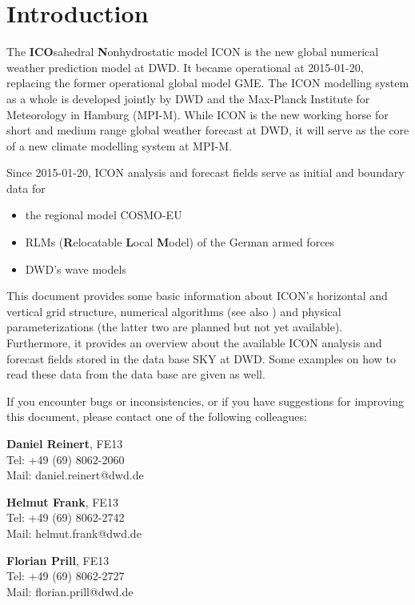 \chapter{Introduction}

The \textbf{ICO}sahedral \textbf{N}onhydrostatic model ICON is the new global numerical 
weather prediction model at DWD. It became operational at 2015-01-20, replacing the former  
operational global model GME. The ICON modelling system as a whole is developed jointly by DWD and the 
Max-Planck Institute for Meteorology in Hamburg (MPI-M). While ICON is the new working horse 
for short and medium range global weather forecast at DWD, it will serve as the core of a new climate 
modelling system at MPI-M.

Since 2015-01-20, ICON analysis and forecast fields serve as initial and boundary data for
\begin{itemize}
 \item the regional model COSMO-EU
 \item RLMs (\textbf{R}elocatable \textbf{L}ocal \textbf{M}odel) of the German armed forces
 \item DWD's wave models
\end{itemize}

This document provides some basic information about ICON's horizontal and vertical grid structure, 
numerical algorithms (see also \cite{Zaengl15}) and physical parameterizations (the latter two are 
planned but not yet available). Furthermore, it provides an overview about the available ICON analysis 
and forecast fields stored in the data base SKY at DWD. Some examples on how to read these data from 
the data base are given as well.

\vfill
If you encounter bugs or inconsistencies, or if you have suggestions for improving this document, 
please contact one of the following colleagues:

\begin{note}
\begin{minipage}{\textwidth}
\centering
\begin{minipage}{0.32\textwidth}
 \textbf{Daniel Reinert}, FE13 \\
 Tel: +49 (69) 8062-2060 \\ 
 Mail: daniel.reinert@dwd.de
\end{minipage}
\begin{minipage}{0.32\textwidth}
 \textbf{Helmut Frank}, FE13\\
 Tel: +49 (69) 8062-2742 \\ 
 Mail: helmut.frank@dwd.de
\end{minipage}
\begin{minipage}{0.32\textwidth}
 \textbf{Florian Prill}, FE13 \\
 Tel: +49 (69) 8062-2727 \\ 
 Mail: florian.prill@dwd.de
\end{minipage}
\end{minipage}
\end{note}  